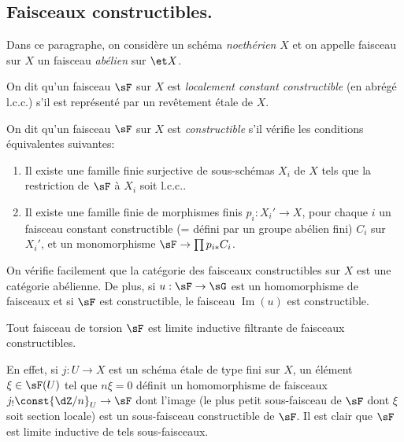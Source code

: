 \subsection{Faisceaux constructibles.}\label{I:4-3}

Dans ce paragraphe, on considère un schéma \emph{noethérien} $X$ et on 
appelle faisceau sur $X$ un faisceau \emph{abélien} sur $\et X$. 





\begin{definitiondotdash}\label{I:4-3-1}
On dit qu'un faisceau $\sF$ sur $X$ est \emph{localement constant constructible} 
(en abrégé l.c.c.) s'il est représenté par un revêtement étale de 
$X$. 
\end{definitiondotdash}





\begin{definitiondotdash}\label{I:4-3-2}
On dit qu'un faisceau $\sF$ sur $X$ est \emph{constructible} s'il vérifie les 
conditions équivalentes suivantes:
\begin{enumerate}[\indent (i)]
  \item Il existe une famille finie surjective de sous-schémas $X_i$ de $X$ 
     tels que la restriction de $\sF$ à $X_i$ soit l.c.c..
  \item Il existe une famille finie de morphismes finis $p_i:X_i'\to X$, pour 
    chaque $i$ un faisceau constant constructible (= défini par un groupe 
    abélien fini) $C_i$ sur $X_i'$, et un monomorphisme 
    $\sF\to \prod p_{i*} C_i$. 
\end{enumerate}
\end{definitiondotdash}

On vérifie facilement que la catégorie des faisceaux constructibles sur $X$ 
est une catégorie abélienne. De plus, si $u:\sF\to \sG$ est un homomorphisme de 
faisceaux et si $\sF$ est constructible, le faisceau $\operatorname{Im}(u)$ est constructible.





\begin{lemmadotdash}\label{I:4-3-3}
Tout faisceau de torsion $\sF$ est limite inductive filtrante de faisceaux 
constructibles.
\end{lemmadotdash}

En effet, si $j:U\to X$ est un schéma étale de type fini sur $X$, un 
élément $\xi\in \sF(U)$ tel que $n\xi=0$ définit un homomorphisme de 
faisceaux $j_! \const{\dZ/n}_U\to \sF$ dont l'image (le plus petit sous-faisceau de 
$\sF$ dont $\xi$ soit section locale) est un sous-faisceau constructible de $\sF$. 
Il est clair que $\sF$ est limite inductive de tels sous-faisceaux.





